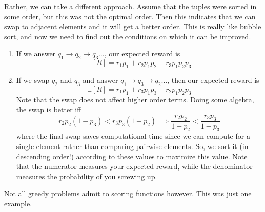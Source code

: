 \begin{example}
    Rather, we can take a different approach. Assume that the tuples were sorted in some order, but this was not the optimal order. Then this indicates that we can swap to adjacent elements and it will get a better order. This is really like bubble sort, and now we need to find out the conditions on which it can be improved.  
    \begin{enumerate}
      \item If we answer $q_1 \rightarrow q_2 \rightarrow q_3 \ldots$, our expected reward is 
        \begin{equation}
          \mathbb{E}[R] = r_1 p_1 + r_2 p_1 p_2 + r_3 p_1 p_2 p_3 
        \end{equation}
      \item If we swap $q_2$ and $q_3$ and answer $q_1 \rightarrow q_3 \rightarrow q_2 \ldots$, then our expected reward is 
        \begin{equation}
          \mathbb{E}[R] = r_1 p_1 + r_3 p_1 p_3 + r_2 p_1 p_2 p_3 
        \end{equation}
      Note that the swap does not affect higher order terms. Doing some algebra, the swap is better iff 
      \begin{equation}
        r_2 p_2 (1 - p_3) < r_3 p_3 (1 - p_2) \implies \frac{r_2 p_2}{1 - p_2} < \frac{r_3 p_3}{1 - p_3}
      \end{equation}
      where the final swap saves computational time since we can compute for a single element rather than comparing pairwise elements. So, we sort it (in descending order!) according to these values to maximize this value. Note that the numerator measures your expected reward, while the denominator measures the probability of you screwing up. 

    \end{enumerate}
  \end{example}

  Not all greedy problems admit to scoring functions however. This was just one example. 

